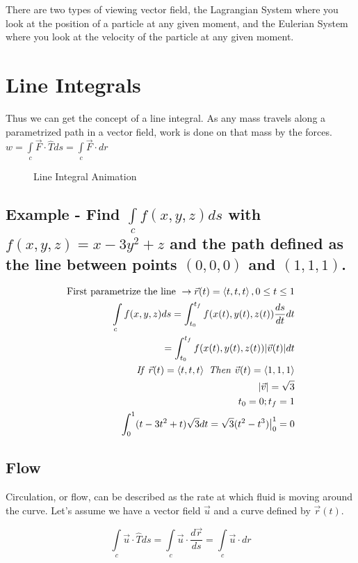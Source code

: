 \documentclass{article}
\newcommand{\nvec}[1]{\left\langle #1 \right\rangle}
\begin{document}
There are two types of viewing vector field, the Lagrangian System where you look at the position of a particle at any given moment, and the Eulerian System where you look at the velocity of the particle at any given moment.

\section{Line Integrals}

Thus we can get the concept of a line integral. As any mass travels along a parametrized path in a vector field, work is done on that mass by the forces. $ w = \int\limits_c \vec{F} \cdot \hat{T} ds = \int\limits_c \vec{F} \cdot dr$

\begin{figure}
\centering
\caption{Line Integral Animation}
\end{figure}

    \subsection{Example - Find $\int\limits_cf(x,y,z)ds$ with $f(x,y,z)=x-3y^2+z$ and the path defined as the line between points $(0,0,0)$ and $(1,1,1)$.}
    \[
    \begin{aligned}
    \text{First parametrize the line } \to \vec{r}(t)=\nvec{t,t,t}, 0 \le t \le 1\\
    \int\limits_c f(x,y,z)ds = \int_{t_0}^{t_f} f(x(t), y(t), z(t)) \frac{ds}{dt} dt\\
    = \int_{t_0}^{t_f} f(x(t), y(t), z(t)) |\vec{v}(t)| dt\\
    \text{\textit{If }} \vec{r}(t) = \nvec{t,t,t} \text{\textit{ Then }} \vec{v}(t) = \nvec{1,1,1}\\
    |\vec{v}|=\sqrt{3}\\
    t_0 = 0; t_f = 1\\
    \int_0^1(t-3t^2+t)\sqrt{3}dt = \sqrt{3}(t^2-t^3)\big{\vert}_0^1=0
    \end{aligned}
    \]

    \subsection{Flow}
    Circulation, or flow, can be described as the rate at which fluid is moving around the curve. Let's assume we have a vector field $\vec{u}$ and a curve defined by $\vec{r}(t)$.

    \begin{equation}
    \int\limits_c \vec{u} \cdot \hat{T} ds = \int\limits_c \vec{u} \cdot \frac{d\vec{r}}{ds} = \int\limits_c \vec{u} \cdot dr
    \end{equation}
\end{document}
